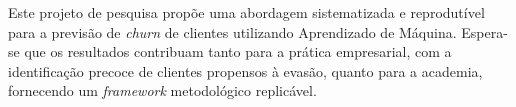 \documentclass[
    article,
    12pt,
    oneside,
    a4paper,
    english,
    brazilian
    ]{abntex2}
\numberwithin{equation}{section}
\begin{document}
Este projeto de pesquisa propõe uma abordagem sistematizada e reprodutível para a previsão de \textit{churn} de clientes utilizando Aprendizado de Máquina. Espera-se que os resultados contribuam tanto para a prática empresarial, com a identificação precoce de clientes propensos à evasão, quanto para a academia, fornecendo um \textit{framework} metodológico replicável.



\end{document}
